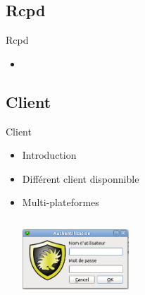 \documentclass[t,12pt]{beamer}
\begin{document}
	  \subsection{Rcpd}
	  \begin{frame}{Rcpd}                                                         %
	      \begin{itemize}                                                   %
		\item
	  \end{itemize}
	  \end{frame} 

	  \subsection{Client}
	  \begin{frame}{Client}                                                         %
	      \begin{itemize}                                                   %
		\item Introduction
		\newline
		\item Différent client disponnible
		\newline
		\item Multi-plateformes
		\newline
		\begin{center}\includegraphics[width=4cm,height=3cm]{images/nuapp.png}\end{center}
	  \end{itemize}
	  \end{frame} 
\end{document}
